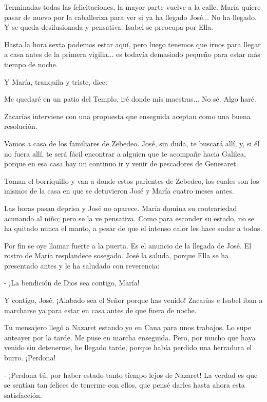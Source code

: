 \documentclass[12pt]{book} %
\begin{document}
Terminadas todas las felicitaciones, la mayor parte vuelve a la calle. María quiere pasar de nuevo por la caballeriza para ver si ya ha llegado José... No ha llegado. Y se queda desilusionada y pensativa. Isabel se preocupa por Ella. 

Hasta la hora sexta podemos estar aquí, pero luego tenemos que irnos para llegar a casa antes de la primera vigilia... es todavía demasiado pequeño para estar más tiempo de noche. 

Y María, tranquila y triste, dice: 

Me quedaré en un patio del Templo, iré donde mis maestras... No sé. Algo haré. 

Zacarías interviene con una propuesta que enseguida aceptan como una buena resolución. 

Vamos a casa de los familiares de Zebedeo. José, sin duda, te buscará allí, y, si él no fuera allí, te será fácil encontrar a alguien que te acompañe hacia Galilea, porque en esa casa hay un continuo ir y venir de pescadores de Genesaret. 

Toman el borriquillo y van a donde estos parientes de Zebedeo, los cuales son los mismos de la casa en que se detuvieron José y María cuatro meses antes. 

Las horas pasan deprisa y José no aparece. María domina su contrariedad acunando al niño; pero se la ve pensativa. Como para esconder su estado, no se ha quitado nunca el manto, a pesar de que el intenso calor les hace sudar a todos. 

Por fin se oye llamar fuerte a la puerta. Es el anuncio de la llegada de José. El rostro de María resplandece sosegado. José la saluda, porque Ella se ha presentado antes y le ha saludado con reverencia: 

- ¡La bendición de Dios sea contigo, María! 

Y contigo, José. ¡Alabado sea el Señor porque has venido! Zacarías e Isabel iban a marcharse ya para estar en casa antes de que fuera de noche. 

Tu mensajero llegó a Nazaret estando yo en Cana para unos trabajos. Lo supe anteayer por la tarde. Me puse en marcha enseguida. Pero, por mucho que haya venido sin detenerme, he llegado tarde, porque había perdido una herradura el burro. ¡Perdona! 

- ¡Perdona tú, por haber estado tanto tiempo lejos de Nazaret! La verdad es que se sentían tan felices de tenerme con ellos, que pensé darles hasta ahora esta satisfacción. 
\end{document}
